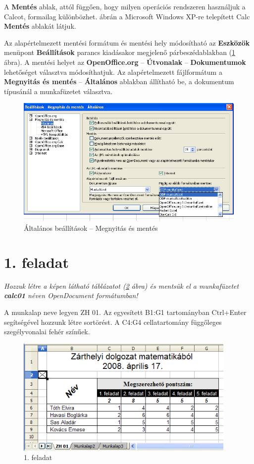 A \textbf{Mentés} ablak, attól függően, hogy milyen
operációs rendszeren használjuk a Calcot, formailag
különbözhet.  ábrán a Microsoft Windows XP-re
telepített Calc \textbf{Mentés} ablakát látjuk.

Az alapértelmezett mentési formátum és mentési hely
módosítható az \textbf{Eszközök} menüpont
\textbf{Beállítások} parancs kiadásakor megjelenő
párbeszédablakban (\ref{MegnyitásMentés} ábra).
A mentési helyet az \textbf{OpenOffice.org} --
\textbf{Útvonalak} --  \textbf{Dokumentumok} lehetőséget
választva módosíthatjuk. Az alapértelmezett  fájlformátum
 a \textbf{Megnyitás és mentés} -- \textbf{Általános}
ablakban állítható be, a dokumentum típusánál a
munkafüzetet választva.

\begin{figure}[!h]
\begin{center}
\includegraphics[width=14.999cm]{oocalcv2-img18.png}
\caption{Általános beállítások --  Megnyitás és mentés}\label{MegnyitásMentés}
\end{center}
\end{figure}


\section{1. feladat}

{\itshape
Hozzuk létre a képen látható táblázatot (\ref{1-feladat} ábra) és
mentsük el a munkafüzetet \textbf{calc01} néven OpenDocument
formátumban!}

A munkalap neve legyen ZH 01. Az egyesített B1:G1 tartományban
Ctrl+Enter segítségével hozzunk létre sortörést. A C4:G4
cellatartomány függőleges szegélyvonalai fehér
színűek.

\begin{figure}[!h]
\begin{center}
\includegraphics[width=10.673cm]{oocalcv2-img19.png}
\caption{1. feladat}\label{1-feladat}
\end{center}
\end{figure}

